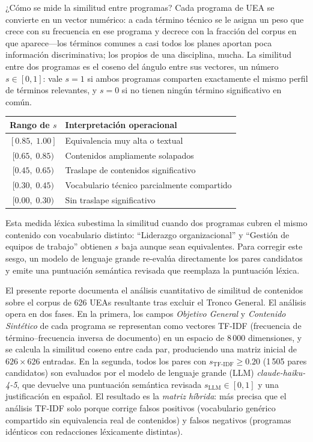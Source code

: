 \documentclass[11pt,a4paper]{article}
\begin{document}
\begin{recuadro}{¿Cómo se mide la similitud entre programas?}
Cada programa de UEA se convierte en un vector numérico: a cada término técnico se le asigna un peso que crece con su frecuencia en ese programa y decrece con la fracción del corpus en que aparece---los términos comunes a casi todos los planes aportan poca información discriminativa; los propios de una disciplina, mucha.
La similitud entre dos programas es el coseno del ángulo entre sus vectores, un número $s \in [0,1]$: vale $s = 1$ si ambos programas comparten exactamente el mismo perfil de términos relevantes, y $s = 0$ si no tienen ningún término significativo en común.

\smallskip
\begin{center}
\small
\begin{tabular}{cl}
\toprule
\textbf{Rango de }$s$ & \textbf{Interpretación operacional} \\
\midrule
$[0.85,\;1.00]$ & Equivalencia muy alta o textual \\
$[0.65,\;0.85)$ & Contenidos ampliamente solapados \\
$[0.45,\;0.65)$ & Traslape de contenidos significativo \\
$[0.30,\;0.45)$ & Vocabulario técnico parcialmente compartido \\
$[0.00,\;0.30)$ & Sin traslape significativo \\
\bottomrule
\end{tabular}
\end{center}
\smallskip

Esta medida léxica subestima la similitud cuando dos programas cubren el mismo contenido con vocabulario distinto: ``Liderazgo organizacional'' y ``Gestión de equipos de trabajo'' obtienen $s$ baja aunque sean equivalentes.
Para corregir este sesgo, un modelo de lenguaje grande re-evalúa directamente los pares candidatos y emite una puntuación semántica revisada que reemplaza la puntuación léxica.
\end{recuadro}

El presente reporte documenta el análisis cuantitativo de similitud de contenidos sobre el corpus de 626 UEAs resultante tras excluir el Tronco General.
El análisis opera en dos fases.
En la primera, los campos \textit{Objetivo General} y \textit{Contenido Sintético} de cada programa se representan como vectores TF-IDF (frecuencia de término--frecuencia inversa de documento) en un espacio de 8\,000 dimensiones, y se calcula la similitud coseno entre cada par, produciendo una matriz inicial de $626 \times 626$ entradas.
En la segunda, todos los pares con $s_{\mathrm{TF\text{-}IDF}} \geq 0.20$ (1\,505 pares candidatos) son evaluados por el modelo de lenguaje grande (LLM) \textit{claude-haiku-4-5}, que devuelve una puntuación semántica revisada $s_{\mathrm{LLM}} \in [0,1]$ y una justificación en español.
El resultado es la \textit{matriz híbrida}: más precisa que el análisis TF-IDF solo porque corrige falsos positivos (vocabulario genérico compartido sin equivalencia real de contenidos) y falsos negativos (programas idénticos con redacciones léxicamente distintas).
\end{document}
